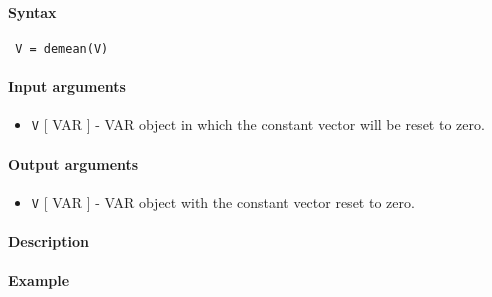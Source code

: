 


	\paragraph{Syntax}
 
 \begin{verbatim}
 V = demean(V)
 \end{verbatim}
 
 \paragraph{Input arguments}
 
 \begin{itemize}
 \item
   \texttt{V} {[} VAR {]} - VAR object in which the constant vector will
   be reset to zero.
 \end{itemize}
 
 \paragraph{Output arguments}
 
 \begin{itemize}
 \item
   \texttt{V} {[} VAR {]} - VAR object with the constant vector reset to
   zero.
 \end{itemize}
 
 \paragraph{Description}
 
 \paragraph{Example}


